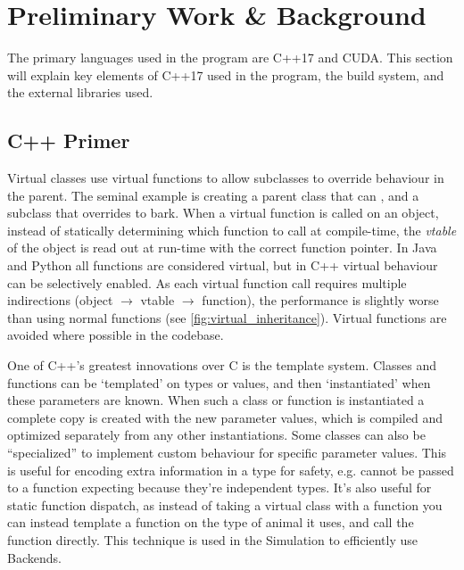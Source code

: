 \section{Preliminary Work \& Background}
The primary languages used in the program are C++17 and CUDA.
This section will explain key elements of C++17 used in the program, the build system, and the external libraries used.

\subsection{C++ Primer}
Virtual classes use virtual functions to allow subclasses to override behaviour in the parent.
The seminal example is creating a parent class  that can , and a subclass  that overrides  to bark.
When a virtual function is called on an object, instead of statically determining which function to call at compile-time, the \emph{vtable} of the object is read out at run-time with the correct function pointer\cite{presentation:RuntimePolymorphism}.
In Java and Python all functions are considered virtual, but in C++ virtual behaviour can be selectively enabled.
As each virtual function call requires multiple indirections (object $\rightarrow$ vtable $\rightarrow$ function), the performance is slightly worse than using normal functions (see \cref{fig:virtual_inheritance}).
Virtual functions are avoided where possible in the codebase.

One of C++'s greatest innovations over C is the template system.
Classes and functions can be `templated' on types or values, and then `instantiated' when these parameters are known.
When such a class or function is instantiated a complete copy is created with the new parameter values, which is compiled and optimized separately from any other instantiations.
Some classes can also be ``specialized'' to implement custom behaviour for specific parameter values.
This is useful for encoding extra information in a type for safety, e.g.  cannot be passed to a function expecting  because they're independent types.
It's also useful for static function dispatch, as instead of taking a virtual class with a  function you can instead template a function on the type of animal it uses, and call the function directly.
This technique is used in the Simulation to efficiently use Backends.

